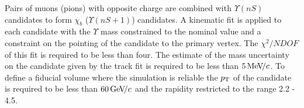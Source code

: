 Pairs of muons (pions) with opposite charge are combined with
$\Upsilon(nS)$ candidates to form $\chi_b$ ($\Upsilon(nS+1)$)
candidates. A kinematic fit is applied to each candidate with the
$\Upsilon$ mass constrained to the nominal value and a constraint on
the pointing of the candidate to the primary vertex. The $\chi^2/NDOF$
of this fit is required to be less than four. The estimate of the mass
uncertainty on the candidate given by the track fit is required to be
less than $5 \text{\,Me\kern -0.1em V\!/}c$. To define a fiducial volume where the simulation
is reliable the $p_{\mathrm{T}}$ of the candidate is required to be less than $60
\text{\,Ge\kern -0.1em V\!/}c$ and the rapidity restricted to the range 2.2 - 4.5. 